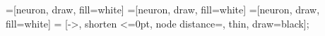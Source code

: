 \begin{neuralnetwork}[height=5]
  =[neuron, draw, fill=white]
  =[neuron, draw, fill=white]
  =[neuron, draw, fill=white]
   = [->, shorten <=0pt, node distance=\nn@layerspacing, thin, draw=black];
  \hiddenlayer[count=5, bias=false, title=Hidden\\layer] \linklayers
  \outputlayer[count=3, title=Output\\layer] \linklayers
\end{neuralnetwork}
